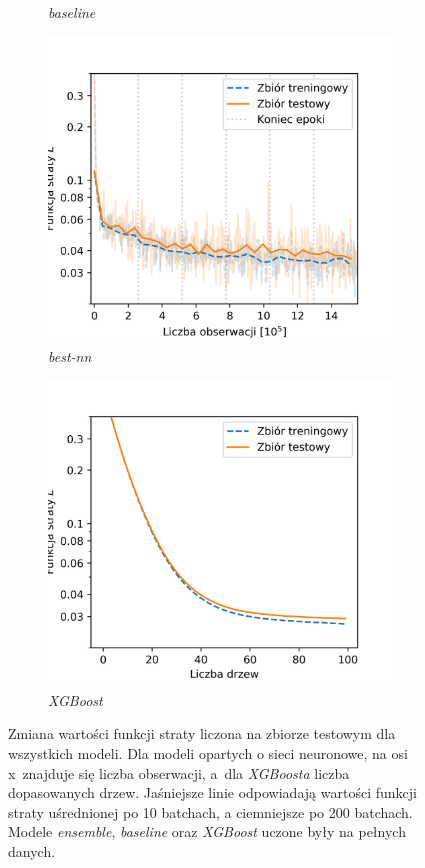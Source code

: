 \documentclass{pracalicmgr}
\begin{document}
\begin{figure}
\begin{subfigure}{.5\textwidth}
	\caption{\textit{baseline}}
	\end{subfigure}
	\begin{subfigure}{.5\textwidth}
	\centering
	\includegraphics[width=1\textwidth]{loss_best-nn.png}
	\caption{\textit{best-nn}}
	\end{subfigure}
	\begin{subfigure}{.5\textwidth}
	\centering
	\includegraphics[width=1\textwidth]{loss_xgb.png}
	\caption{\textit{XGBoost}}
	\end{subfigure}
	\caption{Zmiana wartości funkcji straty liczona na zbiorze testowym dla wszystkich modeli. Dla modeli opartych o sieci neuronowe, na osi x~znajduje się liczba obserwacji, a~dla \textit{XGBoosta} liczba dopasowanych drzew. Jaśniejsze linie odpowiadają wartości funkcji straty uśrednionej po 10 batchach, a ciemniejsze po 200 batchach. Modele \textit{ensemble}, \textit{baseline} oraz \textit{XGBoost} uczone były na pełnych danych.}
	\label{fig:loss}
	\end{figure}	
	
\end{document}
